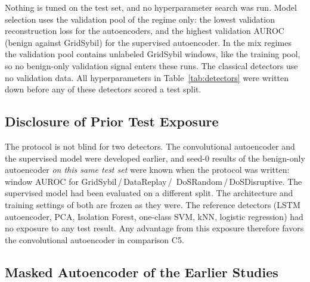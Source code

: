 Nothing is tuned on the test set, and no hyperparameter search was run. Model selection uses the validation pool
of the regime only: the lowest validation reconstruction loss for the autoencoders, and the highest validation
AUROC (benign against GridSybil) for the supervised autoencoder. In the mix regimes the validation pool contains
unlabeled GridSybil windows, like the training pool, so no benign-only validation signal enters these runs. The
classical detectors use no validation data. All hyperparameters in Table~\ref{tab:detectors} were written down
before any of these detectors scored a test split.

\subsection{Disclosure of Prior Test Exposure}\label{sec:exposure}

The protocol is not blind for two detectors. The convolutional autoencoder and the supervised model were developed
earlier, and seed-0 results of the benign-only autoencoder \emph{on this same test set} were known when the
protocol was written: window AUROC  for GridSybil\,/\,DataReplay\,/\,%
DoSRandom\,/\,DoSDisruptive. The supervised model had been evaluated on a different split. The architecture and
training settings of both are frozen as they were. The reference detectors (LSTM autoencoder, PCA, Isolation
Forest, one-class SVM, kNN, logistic regression) had no exposure to any test result. Any advantage from this
exposure therefore favors the convolutional autoencoder in comparison C5.

\subsection{Masked Autoencoder of the Earlier Studies}\label{sec:det-mae}

